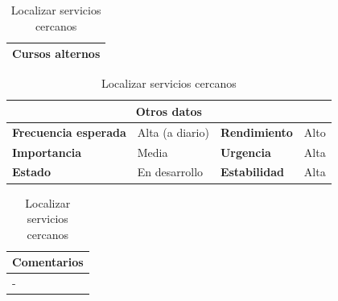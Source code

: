 \documentclass[12pt,spanish]{article}
\begin{document}
\begin{table}[H]
\begin{tabular}{|m{10pt}|m{7.15cm}|m{10pt}|m{7.15cm}|}
\hline
\multicolumn{4}{|m{16.2cm}|}{\textbf{Cursos alternos}} \\
\hline
\end{tabular}

\vspace{1cm}

\begin{tabular}{|m{3.72cm}|m{3.72cm}|m{3.72cm}|m{3.72cm}|}
\hline
\multicolumn{4}{|c|}{\textbf{Otros datos}} \\
\hline
\textbf{Frecuencia esperada} & Alta (a diario) & \textbf{Rendimiento} & Alto \\
\hline
\textbf{Importancia} & Media & \textbf{Urgencia} & Alta \\
\hline
\textbf{Estado} & En desarrollo & \textbf{Estabilidad} & Alta \\
\hline
\end{tabular}

\vspace{1cm}

\begin{tabular}{|m{16.2cm}|}
\hline
\textbf{Comentarios} \\
\hline
- \\
\hline
\end{tabular}

\caption{Localizar servicios cercanos}

\end{table}

\end{document}
